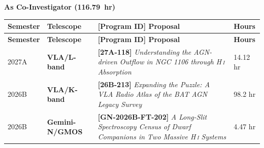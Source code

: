 \documentclass[12pt,letterpaper]{article}
\newcommand{\HI}{H\,\textsc{i}}
\newcommand{\cvsubsection}[1]{%
  \vspace{0.6ex}\noindent\hspace*{0.6em}%
  {\color{darkgreen}\raisebox{0.1em}{\rule{0.35em}{0.35em}}\hspace{0.5em}\textbf{#1}}%
  \par\vspace{0.6ex}\nopagebreak}
\begin{document}
\cvsubsection{As Co-Investigator (116.79~hr)}
\vspace{1.5mm}
{\normalsize
\setlength{\extrarowheight}{0.8mm}
\begin{longtable}{@{}L{0.08\textwidth}L{0.17\textwidth}L{0.63\textwidth}L{0.08\textwidth}@{}}
  \textbf{\color{persongreen}Semester} & \textbf{\color{persongreen}Telescope} & \textbf{\color{persongreen}[Program ID] Proposal} & \textbf{\color{persongreen}Hours} \\[0.5ex]
  \endfirsthead
  \textbf{\color{persongreen}Semester} & \textbf{\color{persongreen}Telescope} & \textbf{\color{persongreen}[Program ID] Proposal} & \textbf{\color{persongreen}Hours} \\[0.5ex]
  \endhead
  2027A & \textbf{VLA/L-band} & \textbf{[27A-118]} \emph{Understanding the AGN-driven Outflow in NGC 1106 through \HI{} Absorption} & 14.12 hr \\
  2026B & \textbf{VLA/K-band} & \textbf{[26B-213]} \emph{Expanding the Puzzle: A VLA Radio Atlas of the BAT AGN Legacy Survey} & 98.2 hr \\
  2026B & \textbf{Gemini-N/GMOS} & \textbf{[GN-2026B-FT-202]} \emph{A Long-Slit Spectroscopy Census of Dwarf Companions in Two Massive \HI{} Systems} & 4.47 hr \\
\end{longtable}}
\end{document}
